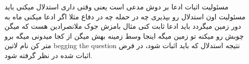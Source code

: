 \documentclass{article}
\begin{document}
		 مسئولیت اثبات ادعا بر دوش مدعی است یعنی وقتی داری استدلال میکنی باید 
		مسئولیت اون استدلال رو بپذیری چه در حمله چه در دفاع
		 مثلا اگر ادعا میکنی ماه به دور زمین میگردد باید ادعا ثابت کنی مثال بامزش جوک ملانصرادین هست که میگن چوبش رو میکنه 
		تو زمین میگه اینجا وسط زمینه بهش میگن از کجا میدونی میگه برو متر کن 
	نام لاتین  begging the question
	نتیجه استدلال که باید اثبات شود،‌ در فرض اثبات شده در نظر گرفته شود.\\
	
	
\end{document}
